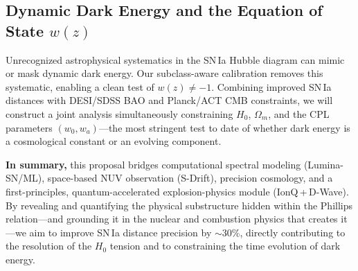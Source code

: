 \documentclass[11pt]{article}
\begin{document}
\subsection{Dynamic Dark Energy and the Equation of State $w(z)$}
Unrecognized astrophysical systematics in the SN\,Ia Hubble diagram can mimic or mask dynamic dark
energy. Our subclass-aware calibration removes this systematic, enabling a clean test of
$w(z)\ne-1$. Combining improved SN\,Ia distances with DESI/SDSS BAO and Planck/ACT CMB constraints,
we will construct a joint analysis simultaneously constraining $H_0$, $\Omega_m$, and the CPL
parameters $(w_0,w_a)$---the most stringent test to date of whether dark energy is a cosmological
constant or an evolving component.

\begin{tcolorbox}[enhanced,colback=inkblue,colframe=inkblue,coltext=white,boxrule=0pt,arc=2pt,
  left=10pt,right=10pt,top=8pt,bottom=8pt]
\textbf{In summary,} this proposal bridges computational spectral modeling (Lumina-SN/ML),
space-based NUV observation (S-Drift), precision cosmology, and a first-principles,
quantum-accelerated explosion-physics module (IonQ\,+\,D-Wave). By revealing and quantifying the
physical substructure hidden within the Phillips relation---and grounding it in the nuclear and
combustion physics that creates it---we aim to improve SN\,Ia distance precision by $\sim$30\%,
directly contributing to the resolution of the $H_0$ tension and to constraining the time evolution
of dark energy.
\end{tcolorbox}
\end{document}
